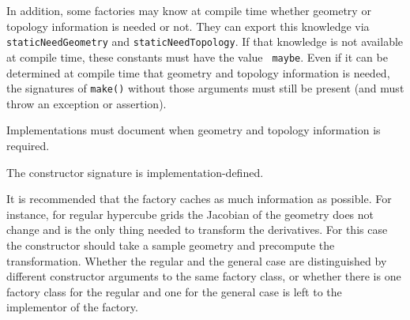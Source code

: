 \documentclass[a4paper,11pt]{article}
\begin{document}
In addition, some factories may know at compile time whether geometry or
topology information is needed or not.  They can export this knowledge via
{\tt staticNeedGeometry} and {\tt staticNeedTopology}.  If that knowledge is
not available at compile time, these constants must have the value {\tt
  maybe}.  Even if it can be determined at compile time that geometry and
topology information is needed, the signatures of {\tt make()} without those
arguments must still be present (and must throw an exception or assertion).

Implementations must document when geometry and topology information is
required.

The constructor signature is implementation-defined.

It is recommended that the factory caches as much information as possible.
For instance, for regular hypercube grids the Jacobian of the geometry does
not change and is the only thing needed to transform the derivatives.  For
this case the constructor should take a sample geometry and precompute the
transformation.  Whether the regular and the general case are distinguished by
different constructor arguments to the same factory class, or whether there is
one factory class for the regular and one for the general case is left to the
implementor of the factory.
\end{document}

